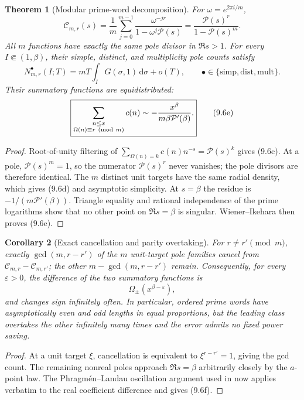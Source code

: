 \documentclass[11pt]{article}
\newtheorem{theorem}{Theorem}[section]
\newtheorem{corollary}[theorem]{Corollary}
\theoremstyle{definition}
\theoremstyle{remark}
\newcommand{\cP}{\mathcal P}
\newcommand{\dd}{\,\mathrm d}
\newcommand{\eps}{\varepsilon}
\begin{document}
\begin{theorem}[Modular prime-word decomposition]
\label{thm:modular-factorizations}
For $\omega=e^{2\pi i/m}$,
\[
 \boxed{
 \mathcal C_{m,r}(s)
 =\frac1m\sum_{j=0}^{m-1}\frac{\omega^{-jr}}{1-\omega^j\cP(s)}
 =\frac{\cP(s)^r}{1-\cP(s)^m}.
 }
\tag{9.6c}
\]
All $m$ functions have exactly the same pole divisor in $\Re s>1$.  For every
$I\Subset(1,\beta)$, their simple, distinct, and multiplicity pole counts satisfy
\[
 N_{m,r}^{\bullet}(I;T)
 =mT\int_I G(\sigma,1)\dd\sigma+o(T),
 \qquad \bullet\in\{\mathrm{simp},\mathrm{dist},\mathrm{mult}\}.
\tag{9.6d}
\]
Their summatory functions are equidistributed:
\[
 \boxed{
 \sum_{\substack{n\le x\\\Omega(n)\equiv r\ ({\rm mod}\ m)}}c(n)
 \sim-\frac{x^\beta}{m\beta\cP'(\beta)}.
 }
\tag{9.6e}
\]
\end{theorem}

\begin{proof}
Root-of-unity filtering of
$\sum_{\Omega(n)=k}c(n)n^{-s}=\cP(s)^k$ gives (9.6c).  At a pole,
$\cP(s)^m=1$, so the numerator $\cP(s)^r$ never vanishes; the pole divisors are
therefore identical.  The $m$ distinct unit targets have the same radial density,
which gives (9.6d) and asymptotic simplicity.  At $s=\beta$ the residue is
$-1/(m\cP'(\beta))$.  Triangle equality and rational independence of the prime
logarithms show that no other point on $\Re s=\beta$ is singular.  Wiener--Ikehara
then proves (9.6e).
\end{proof}

\begin{corollary}[Exact cancellation and parity overtaking]
\label{cor:modular-cancellation}
For $r\ne r'\pmod m$, exactly $\gcd(m,r-r')$ of the $m$ unit-target pole families
cancel from $\mathcal C_{m,r}-\mathcal C_{m,r'}$; the other
$m-\gcd(m,r-r')$ remain.  Consequently, for every $\eps>0$, the difference of the
two summatory functions is
\[
 \Omega_\pm(x^{\beta-\eps}),
\tag{9.6f}
\]
and changes sign infinitely often.  In particular, ordered prime words have
asymptotically even and odd lengths in equal proportions, but the leading class
overtakes the other infinitely many times and the error admits no fixed power saving.
\end{corollary}

\begin{proof}
At a unit target $\xi$, cancellation is equivalent to $\xi^{r-r'}=1$, giving the
gcd count.  The remaining nonreal poles approach $\Re s=\beta$ arbitrarily closely by
the $a$-point law.  The Phragm\'en--Landau oscillation argument used in
\cite{MontgomeryTenenbaum2017} now applies verbatim to the real coefficient
difference and gives (9.6f).
\end{proof}
\end{document}
